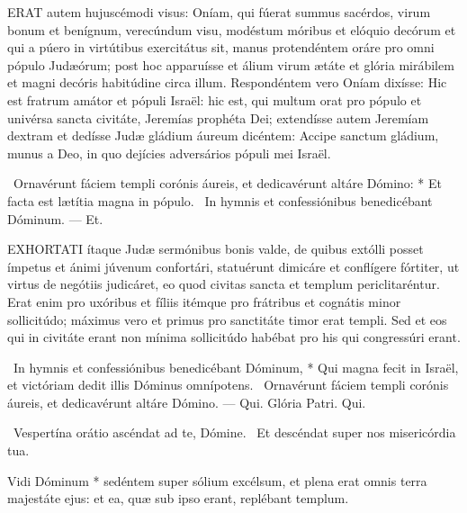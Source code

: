 
\lettrine[lines=2]{E}{RAT} autem hujuscémodi visus: Oníam, qui fúerat summus sacérdos, virum bonum et benígnum, verecúndum visu, modéstum móribus et elóquio decórum et qui a púero in virtútibus exercitátus sit, manus protendéntem oráre pro omni pópulo Judæórum; post hoc apparuísse et álium virum ætáte et glória mirábilem et magni decóris habitúdine circa illum. Respondéntem vero Oníam dixísse: Hic est fratrum amátor et pópuli Israël: hic est, qui multum orat pro pópulo et univérsa sancta civitáte, Jeremías prophéta Dei; extendísse autem Jeremíam dextram et dedísse Judæ gládium áureum dicéntem: Accipe sanctum gládium, munus a Deo, in quo dejícies adversários pópuli mei Israël.

\R\ Ornavérunt fáciem templi corónis áureis, et dedicavérunt altáre Dómino: * Et facta est lætítia magna in pópulo. \V\ In hymnis et confessiónibus benedicébant Dóminum. — Et.



\lettrine[lines=2]{E}{XHORTATI} ítaque Judæ sermónibus bonis valde, de quibus extólli posset ímpetus et ánimi júvenum confortári, statuérunt dimicáre et conflígere fórtiter, ut virtus de negótiis judicáret, eo quod civitas sancta et templum periclitaréntur. Erat enim pro uxóribus et fíliis itémque pro frátribus et cognátis minor sollicitúdo; máximus vero et primus pro sanctitáte timor erat templi. Sed et eos qui in civitáte erant non mínima sollicitúdo habébat pro his qui congressúri erant.

\R\ In hymnis et confessiónibus benedicébant Dóminum, * Qui magna fecit in Israël, et victóriam dedit illis Dóminus omnípotens. \V\ Ornavérunt fáciem templi corónis áureis, et dedicavérunt altáre Dómino. — Qui. Glória Patri. Qui.



\V\ Vespertína orátio ascéndat ad te, Dómine. \R\ Et descéndat super nos misericórdia tua.

 Vidi Dóminum * sedéntem super sólium excélsum, et plena erat omnis terra majestáte ejus: et ea, quæ sub ipso erant, replébant templum.


